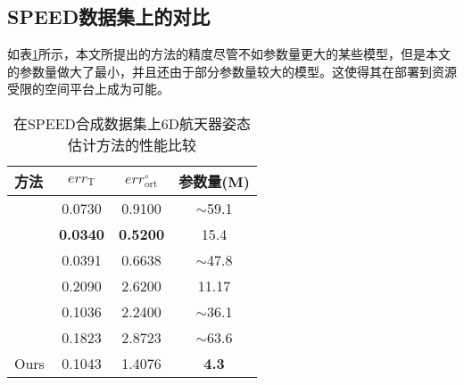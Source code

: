 \subsection{SPEED数据集上的对比}
如表\ref{tab:SPEED_Comparison}所示，本文所提出的方法的精度尽管不如参数量更大的某些模型，但是本文的参数量做大了最小，并且还由于部分参数量较大的模型。这使得其在部署到资源受限的空间平台上成为可能。
\begin{table}[htbp]
	\centering
	\caption{在SPEED合成数据集上6D航天器姿态估计方法的性能比较}
	\label{tab:SPEED_Comparison}
	\begin{tabular}{lccc}
		\toprule
		方法 & $err_{\text{T}}$ & $err_{\text{ort}}^{\circ}$ & 参数量(M) \\
		\midrule
		\citet{gerard2019segmentation} & 0.0730 & 0.9100 & $\sim$59.1 \\
		\citet{lotti2022investigating} & \textbf{0.0340} & \textbf{0.5200} & 15.4 \\
		\citet{wang2022revisiting} & 0.0391 & 0.6638 & $\sim$47.8 \\
		\citet{park2019towards} & 0.2090 & 2.6200 & 11.17 \\
		\citet{piazza2021deep} & 0.1036 & 2.2400 & $\sim$36.1 \\
		\citet{huan2020pose} & 0.1823 & 2.8723 & $\sim$63.6 \\
		Ours & 0.1043 & 1.4076 & \textbf{4.3} \\
		\bottomrule
	\end{tabular}
\end{table}
